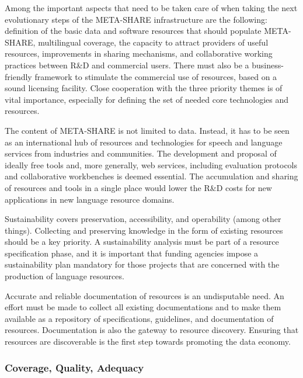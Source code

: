 \documentclass[10pt, plain]{../../metanetpaper}
\begin{document}
\begin{multicols}{2}
Among the important aspects that need to be taken care of when taking the next evolutionary steps of the META-SHARE infrastructure are the following: definition of the basic data and software resources that should populate META-SHARE, multilingual coverage, the capacity to attract providers of useful resources, improvements in sharing mechanisms, and collaborative working practices between R\&D and commercial users. There must also be a business-friendly framework to stimulate the commercial use of resources, based on a sound licensing facility. Close cooperation with the three priority themes is of vital importance, especially for defining the set of needed core technologies and resources.

The content of META-SHARE is not limited to data. Instead, it has to be seen as an international hub of resources and technologies for speech and language services from industries and communities. The development and proposal of ideally free tools and, more generally, web services, including evaluation protocols and collaborative workbenches is deemed essential. The accumulation and sharing of resources and tools in a single place would lower the R\&D costs for new applications in new language resource domains.

Sustainability covers preservation, accessibility, and operability (among other things). Collecting and preserving knowledge in the form of existing resources should be a key priority. A sustainability analysis must be part of a resource specification phase, and it is important that funding agencies impose a sustainability plan mandatory for those projects that are concerned with the production of language resources.

Accurate and reliable documentation of resources is an undisputable need. An effort must be made to collect all existing documentations and to make them available as a repository of specifications, guidelines, and documentation of resources. Documentation is also the gateway to resource discovery. Ensuring that resources are discoverable is the first step towards promoting the data economy. 

\subsubsection{Coverage, Quality, Adequacy}
\label{sec:cover-qual-adeq}


\end{multicols}
\end{document}
